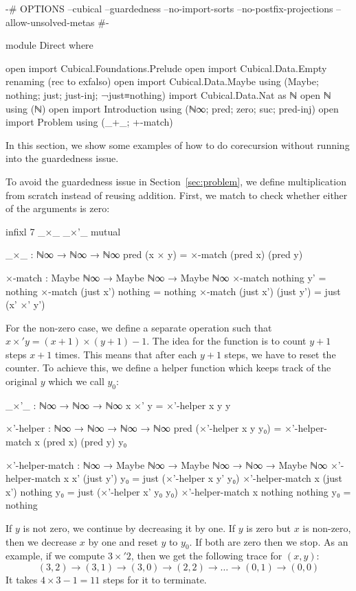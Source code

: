 \begin{code}[hide]
{-# OPTIONS --cubical --guardedness --no-import-sorts --no-postfix-projections --allow-unsolved-metas #-}

module Direct where

open import Cubical.Foundations.Prelude
open import Cubical.Data.Empty
  renaming (rec to exfalso)
open import Cubical.Data.Maybe using (Maybe; nothing; just; just-inj; ¬just≡nothing)
import Cubical.Data.Nat as ℕ
open ℕ using (ℕ)
open import Introduction using (ℕ∞; pred; zero; suc; pred-inj)
open import Problem using (_+_; +-match)
\end{code}
In this section, we show some examples of how to do corecursion without running
into the guardedness issue.

To avoid the guardedness issue in Section~\ref{sec:problem}, we define
multiplication from scratch instead of reusing addition. First, we match to
check whether either of the arguments is zero:
\begin{code}[hide]
infixl 7 _×_ _×'_
mutual
\end{code}
\begin{code}
  _×_ : ℕ∞ → ℕ∞ → ℕ∞
  pred (x × y) = ×-match (pred x) (pred y)

  ×-match : Maybe ℕ∞ → Maybe ℕ∞ → Maybe ℕ∞
  ×-match nothing    y'         = nothing
  ×-match (just x')  nothing    = nothing
  ×-match (just x')  (just y')  = just (x' ×' y')
\end{code}
For the non-zero case, we define a separate operation 
such that $x\times'y = (x+1)\times(y+1)-1$. The idea for the function is to
count $y+1$ steps $x+1$ times. This means that after each $y+1$ steps, we have
to reset the counter. To achieve this, we define a helper function which keeps
track of the original $y$ which we call $y_0$:
\begin{code}
  _×'_ : ℕ∞ → ℕ∞ → ℕ∞
  x ×' y = ×'-helper x y y

  ×'-helper : ℕ∞ → ℕ∞ → ℕ∞ → ℕ∞
  pred (×'-helper x y y₀) =
    ×'-helper-match x (pred x) (pred y) y₀

  ×'-helper-match :
    ℕ∞ → Maybe ℕ∞ → Maybe ℕ∞ → ℕ∞ →
    Maybe ℕ∞
  ×'-helper-match x x' (just y') y₀ =
    just (×'-helper x y' y₀)
  ×'-helper-match x (just x') nothing y₀ =
    just (×'-helper x' y₀ y₀)
  ×'-helper-match x nothing nothing y₀ =
    nothing
\end{code}
If $y$ is not zero, we continue by decreasing it by one. If $y$ is zero but $x$
is non-zero, then we decrease $x$ by one and reset $y$ to $y_0$. If both are
zero then we stop. As an example, if we compute $3 \times' 2$, then we get the
following trace for $(x, y)$:
\[
  (3,2) \to (3,1) \to (3,0) \to (2,2) \to \dots \to (0,1) \to (0,0)
\]
It takes $4 \times 3 - 1 = 11$ steps for it to terminate.

